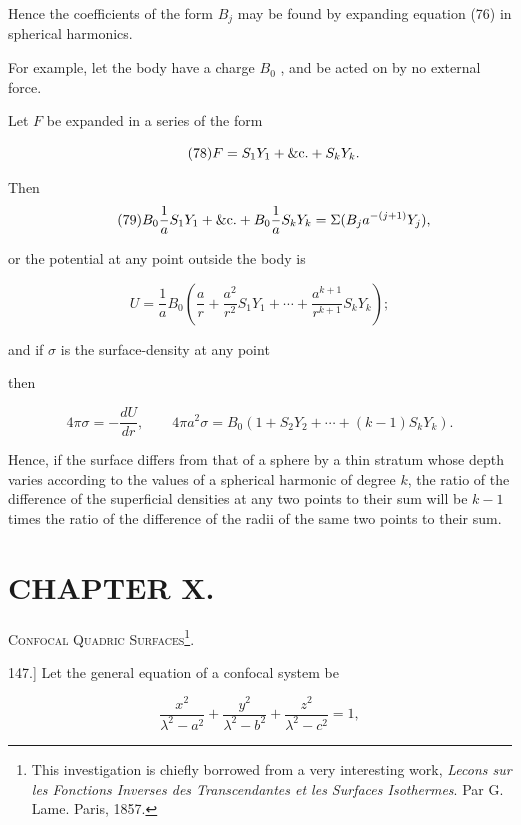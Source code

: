 \documentclass[11pt,a4paper]{article}
\begin{document}
Hence the coefficients of the form  $B_j$  may be found by expanding equation (76) in spherical harmonics.

For example, let the body have a charge  $B_0$ , and be acted on by no external force.

Let $F$ be expanded in a series of the form

\begin{equation}\tag{78}
F=S_1Y_1+\hbox{\&c.}+S_kY_k.
\end{equation}

Then 
\begin{equation}\tag{79}
B_0\frac{1}{a}S_1Y_1+\hbox{\&c.}+B_0\frac{1}{a}S_kY_k=\Sigma(B_ja^{-(j+1)}Y_j),
\end{equation}

or the potential at any point outside the body is

\begin{equation}\tag{80}
U=\frac{1}{a}B_0\left(\frac{a}{r}+\frac{a^2}{r^2}S_1Y_1+\cdots+\frac{a^{k+1}}{r^{k+1}}S_kY_k\right);
\end{equation}

and if $\sigma$ is the surface-density at any point

then

\begin{equation}\tag{81}
4\pi\sigma=-\frac{dU}{dr},\qquad
4\pi a^2\sigma=B_0\left(1+S_2Y_2+\cdots+(k-1)S_kY_k\right).
\end{equation}

Hence, if the surface differs from that of a sphere by a thin stratum whose depth varies according to the values of a spherical harmonic of degree $k$, the ratio of the difference of the superficial densities at any two points to their sum will be $k-1$ times the ratio of the difference of the radii of the same two points to their sum.

\section*{CHAPTER X.}

{\centering\scshape Confocal Quadric Surfaces\footnote{This investigation is chiefly borrowed from a very interesting work, \emph{Lecons sur les Fonctions Inverses des Transcendantes et les Surfaces Isothermes}. Par G. Lame. Paris, 1857.}.\par}

147.] Let the general equation of a confocal system be

\begin{equation}\tag{1}
\frac{x^2}{\lambda^2 - a^2} + \frac{y^2}{\lambda^2 - b^2} + \frac{z^2}{\lambda^2 - c^2} = 1,
\end{equation}
\end{document}
